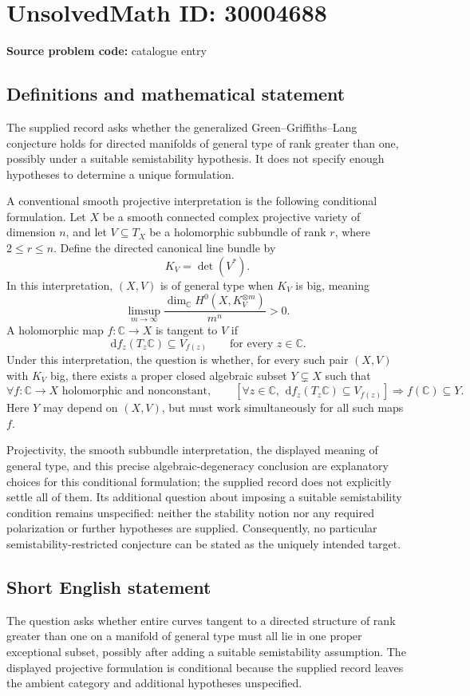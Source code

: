 \documentclass[11pt]{article}
\newcommand{\C}{\mathbb{C}}
\newcommand{\dd}{\,\mathrm{d}}
\begin{document}
\section*{UnsolvedMath ID: 30004688}
\textbf{Source problem code:} catalogue entry
\subsection{Definitions and mathematical statement}
The supplied record asks whether the generalized Green--Griffiths--Lang conjecture holds for directed manifolds of general type of rank greater than one, possibly under a suitable semistability hypothesis. It does not specify enough hypotheses to determine a unique formulation.

A conventional smooth projective interpretation is the following conditional formulation. Let \(X\) be a smooth connected complex projective variety of dimension \(n\), and let \(V\subseteq T_X\) be a holomorphic subbundle of rank \(r\), where \(2\leq r\leq n\). Define the directed canonical line bundle by
\[
K_V=\det(V^*).
\]
In this interpretation, \((X,V)\) is of general type when \(K_V\) is big, meaning
\[
\limsup_{m\to\infty}\frac{\dim_{\C}H^0(X,K_V^{\otimes m})}{m^n}>0.
\]
A holomorphic map \(f:\C\to X\) is tangent to \(V\) if
\[
\dd f_z(T_z\C)\subseteq V_{f(z)}\qquad\text{for every }z\in\C.
\]
Under this interpretation, the question is whether, for every such pair \((X,V)\) with \(K_V\) big, there exists a proper closed algebraic subset \(Y\subsetneq X\) such that
\[
\forall f:\C\to X\text{ holomorphic and nonconstant},\qquad
\left[\forall z\in\C,\ \dd f_z(T_z\C)\subseteq V_{f(z)}\right]
\Longrightarrow f(\C)\subseteq Y.
\]
Here \(Y\) may depend on \((X,V)\), but must work simultaneously for all such maps \(f\).

Projectivity, the smooth subbundle interpretation, the displayed meaning of general type, and this precise algebraic-degeneracy conclusion are explanatory choices for this conditional formulation; the supplied record does not explicitly settle all of them. Its additional question about imposing a suitable semistability condition remains unspecified: neither the stability notion nor any required polarization or further hypotheses are supplied. Consequently, no particular semistability-restricted conjecture can be stated as the uniquely intended target.
\subsection{Short English statement}
The question asks whether entire curves tangent to a directed structure of rank greater than one on a manifold of general type must all lie in one proper exceptional subset, possibly after adding a suitable semistability assumption. The displayed projective formulation is conditional because the supplied record leaves the ambient category and additional hypotheses unspecified.
\end{document}
